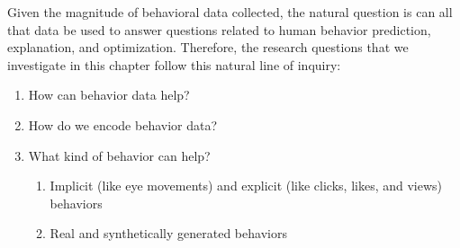 Given the magnitude of behavioral data collected, the natural question is can all that data be used to answer questions related to human behavior prediction, explanation, and optimization. Therefore, the research questions that we investigate in this chapter follow this natural line of inquiry:
\begin{enumerate}
    \item How can behavior data help?

    \item How do we encode behavior data?

    \item What kind of behavior can help?
    \begin{enumerate}
        \item Implicit (like eye movements) and explicit (like clicks, likes, and views) behaviors
        \item Real and synthetically generated behaviors
    \end{enumerate}
    
\end{enumerate}






